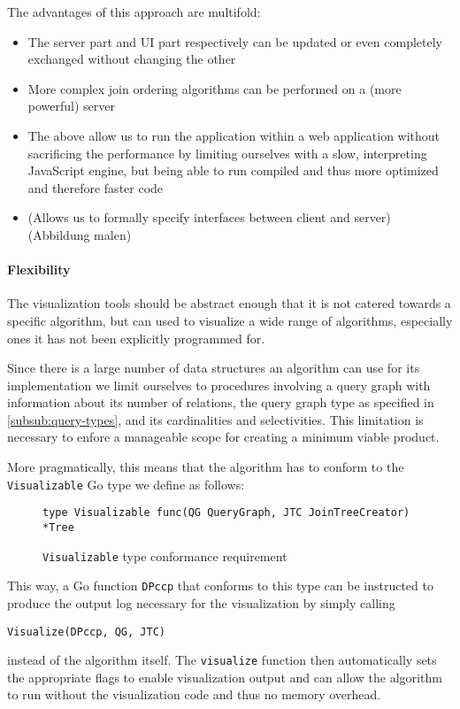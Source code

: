 The advantages of this approach are multifold:
\begin{itemize}
    \item The server part and UI part respectively can be
          updated or even completely exchanged without 
          changing the other
    \item More complex join ordering algorithms can be 
          performed on a (more powerful) server
    \item The above allow us to run the application 
          within a web application without sacrificing 
          the performance by limiting ourselves with a 
          slow, interpreting JavaScript engine, but being 
          able to run compiled and thus more optimized and therefore faster 
          code
    \item (Allows us to formally specify interfaces between
          client and server) (Abbildung malen)
\end{itemize}

\paragraph{Flexibility}
The visualization tools should be abstract enough that it is not catered towards a specific algorithm, but can used to visualize a wide range of algorithms, especially ones it has not been explicitly programmed for.  

Since there is a large number of data structures an algorithm can use for its implementation we limit ourselves to procedures involving a query graph with information about its number of relations, the query graph type as specified in \ref{subsub:query-types}, and its cardinalities and selectivities.
This limitation is necessary to enfore a manageable scope for creating a minimum viable product.

More pragmatically, this means that the algorithm has to 
conform to the \texttt{Visualizable} Go type we define as 
follows:

\begin{figure}[H]
    \begin{verbatim}
type Visualizable func(QG QueryGraph, JTC JoinTreeCreator) *Tree
    \end{verbatim}
    \caption{\texttt{Visualizable} type conformance requirement}
    \centering
\label{fig:visalizable}
\end{figure}

\begin{example}
This way, a Go function \texttt{DPccp} that conforms to this type can be instructed to produce the output  log necessary for the visualization by simply calling 

\begin{verbatim}
Visualize(DPccp, QG, JTC)
\end{verbatim}
instead of the algorithm itself. The \texttt{visualize} function then automatically sets the appropriate flags to enable visualization output and can allow the algorithm to run without the visualization code and thus no memory overhead.

\end{example}

